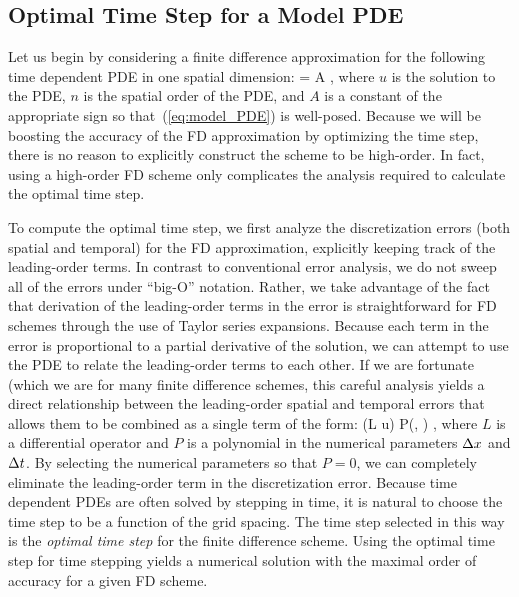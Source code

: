 \documentclass[oneeqnum,onefignum,onetabnum,onethmnum]{siamltex}
\begin{document}
\subsection{\label{sec:ots_model_pde} 
            Optimal Time Step for a Model PDE}
Let us begin by considering a finite difference approximation for the
following time dependent PDE in one spatial dimension: 
\beq
   = A ,
  \label{eq:model_PDE}
\eeq
where $u$ is the solution to the PDE, $n$ is the spatial order of the 
PDE, and $A$ is a constant of the appropriate sign so that~(\ref{eq:model_PDE}) 
is well-posed.  Because we will be boosting the accuracy of the FD 
approximation by optimizing the time step, there is no reason to explicitly
construct the scheme to be high-order.  In fact, using a high-order FD scheme 
only complicates the analysis required to calculate the optimal time 
step.  

To compute the optimal time step, we first analyze the discretization errors 
(both spatial and temporal) for the FD approximation, explicitly keeping track 
of the leading-order terms.  In contrast to conventional error analysis, we 
do not sweep all of the errors under ``big-O'' notation.  Rather, we take 
advantage of the fact that derivation of the leading-order terms in the 
error is straightforward for FD schemes through the use of Taylor series 
expansions.  Because each term in the error is proportional to a partial 
derivative of the solution, we can attempt to use the PDE to relate the 
leading-order terms to each other.  If we are fortunate (which we are
for many finite difference schemes, this careful analysis yields a direct 
relationship between the leading-order spatial and temporal errors that allows 
them to be combined as a single term of the form:
\beq
  (L u) P(\dx, \dt) ,
  \label{eq:leading_order_error_model_PDE_general}
\eeq
where $L$ is a differential operator and $P$ is a polynomial in the numerical 
parameters $\Delta x$ and $\Delta t$.  By selecting the numerical parameters so that 
$P = 0$, we can completely eliminate the leading-order term in the 
discretization error.  Because time dependent PDEs are often solved by 
stepping in time, it is natural to choose the time step to be a function of 
the grid spacing.  The time step selected in this way is the
\emph{optimal time step} for the finite difference scheme.  Using the optimal
time step for time stepping yields a numerical solution with the maximal order 
of accuracy for a given FD scheme.
\end{document}
